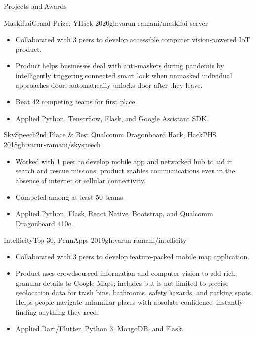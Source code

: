 \documentclass[]{mcdowellcv}
\begin{document}
	\begin{cvsection}{Projects and Awards}
		\begin{cvsubsection}{Maskif.ai}{Grand Prize, YHack 2020}{gh:varun-ramani/maskifai-server}
			\begin{itemize}
				\item Collaborated with 3 peers to develop accessible computer vision-powered IoT product.
				\item Product helps businesses deal with anti-maskers during pandemic by intelligently 
				triggering connected smart lock when unmasked individual approaches door; 
				automatically unlocks door after they leave.
				\item Beat 42 competing teams for first place.
				\item Applied Python, Tensorflow, Flask, and Google Assistant SDK. 
			\end{itemize}
		\end{cvsubsection}
		\begin{cvsubsection}{SkySpeech}{2nd Place \& Best Qualcomm Dragonboard Hack, HackPHS 2018}{gh:varun-ramani/skyspeech}
			\vspace{0.8em}
			\begin{itemize}
				\item Worked with 1 peer to develop mobile app and networked hub to aid in search and rescue missions; 
				product enables communications even in the absence of internet or cellular connectivity.
				\item Competed among at least 50 teams.
				\item Applied Python, Flask, React Native, Bootstrap, and Qualcomm Dragonboard 410c.
			\end{itemize}
		\end{cvsubsection}
		\begin{cvsubsection}{Intellicity}{Top 30, PennApps 2019}{gh:varun-ramani/intellicity}
			\begin{itemize}
				\item Collaborated with 3 peers to develop feature-packed mobile map application.
				\item Product uses crowdsourced information and computer vision to add rich, granular details
				to Google Maps; includes but is not limited to precise geolocation data for trash bins, bathrooms, 
				safety hazards, and parking spots. Helps people navigate unfamiliar
				places with absolute confidence, instantly finding anything they need.
				\item Applied Dart/Flutter, Python 3, MongoDB, and Flask.

\end{itemize}
\end{cvsubsection}
\end{cvsection}
\end{document}
